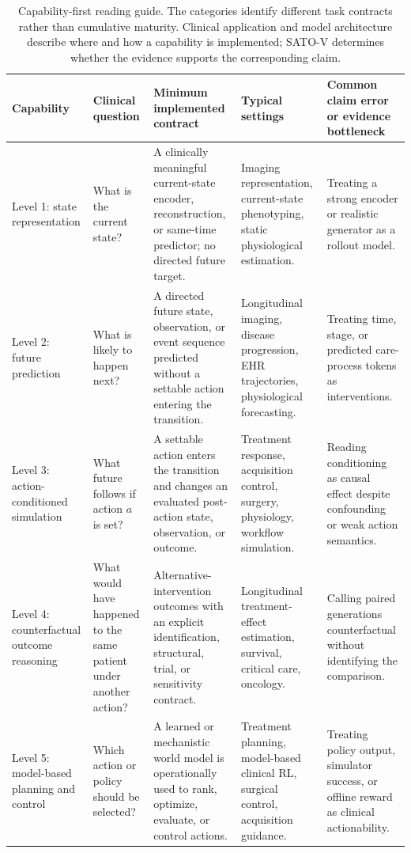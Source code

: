 \begin{table}[t]
\caption{Capability-first reading guide. The categories identify different task contracts rather than cumulative maturity. Clinical application and model architecture describe where and how a capability is implemented; SATO-V determines whether the evidence supports the corresponding claim.}
\label{tab:capability-guide}
\centering
\small
\setlength{\tabcolsep}{4pt}
\renewcommand{\arraystretch}{1.08}
\begin{tabularx}{\textwidth}{@{}p{2.35cm}p{2.55cm}p{3.15cm}p{3.0cm}X@{}}
\toprule
\textbf{Capability} & \textbf{Clinical question} & \textbf{Minimum implemented contract} & \textbf{Typical settings} & \textbf{Common claim error or evidence bottleneck} \\
\midrule
Level 1: state representation & What is the current state? & A clinically meaningful current-state encoder, reconstruction, or same-time predictor; no directed future target. & Imaging representation, current-state phenotyping, static physiological estimation. & Treating a strong encoder or realistic generator as a rollout model. \\
Level 2: future prediction & What is likely to happen next? & A directed future state, observation, or event sequence predicted without a settable action entering the transition. & Longitudinal imaging, disease progression, EHR trajectories, physiological forecasting. & Treating time, stage, or predicted care-process tokens as interventions. \\
Level 3: action-conditioned simulation & What future follows if action $a$ is set? & A settable action enters the transition and changes an evaluated post-action state, observation, or outcome. & Treatment response, acquisition control, surgery, physiology, workflow simulation. & Reading conditioning as causal effect despite confounding or weak action semantics. \\
Level 4: counterfactual outcome reasoning & What would have happened to the same patient under another action? & Alternative-intervention outcomes with an explicit identification, structural, trial, or sensitivity contract. & Longitudinal treatment-effect estimation, survival, critical care, oncology. & Calling paired generations counterfactual without identifying the comparison. \\
Level 5: model-based planning and control & Which action or policy should be selected? & A learned or mechanistic world model is operationally used to rank, optimize, evaluate, or control actions. & Treatment planning, model-based clinical RL, surgical control, acquisition guidance. & Treating policy output, simulator success, or offline reward as clinical actionability. \\
\bottomrule
\end{tabularx}
\end{table}
